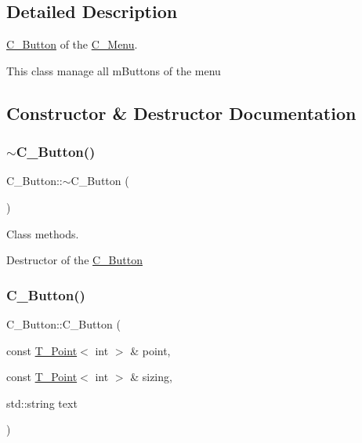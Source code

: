 \subsection{Detailed Description}
\hyperlink{classC__Button}{C\+\_\+\+Button} of the \hyperlink{classC__Menu}{C\+\_\+\+Menu}. 

This class manage all m\+Buttons of the menu 

\subsection{Constructor \& Destructor Documentation}
\mbox{\label{classC__Button_a8581fb2ad14e232e97040388bdc992e4}} 
\subsubsection{\texorpdfstring{$\sim$\+C\+\_\+\+Button()}{~C\_Button()}}
{\footnotesize\ttfamily C\+\_\+\+Button\+::$\sim$\+C\+\_\+\+Button (\begin{DoxyParamCaption}{ }\end{DoxyParamCaption})\hspace{0.3cm}{\ttfamily [default]}}



Class methods. 

Destructor of the \hyperlink{classC__Button}{C\+\_\+\+Button} \mbox{\label{classC__Button_a39291cec8e3a327343328f6fa1a3b3d9}} 
\subsubsection{\texorpdfstring{C\+\_\+\+Button()}{C\_Button()}\hspace{0.1cm}{\footnotesize\ttfamily [1/2]}}
{\footnotesize\ttfamily C\+\_\+\+Button\+::\+C\+\_\+\+Button (\begin{DoxyParamCaption}\item[{const \hyperlink{classT__Point}{T\+\_\+\+Point}$<$ int $>$ \&}]{point,  }\item[{const \hyperlink{classT__Point}{T\+\_\+\+Point}$<$ int $>$ \&}]{sizing,  }\item[{std\+::string}]{text }\end{DoxyParamCaption})}



